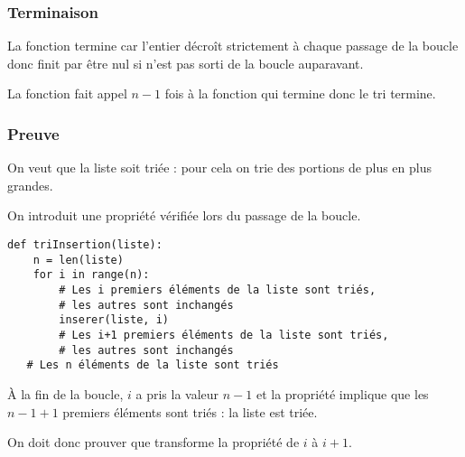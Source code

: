\subsubsection{Terminaison} La fonction  termine car l'entier  décroît strictement à chaque passage de la boucle donc finit par être nul si n'est pas sorti de la boucle auparavant.

La fonction  fait appel $n-1$ fois à la fonction   qui termine donc le tri termine.

\subsubsection{Preuve} On veut que la liste soit triée : pour cela on trie des portions de plus en plus grandes.

On introduit une propriété vérifiée lors du passage de la boucle.
\begin{lstlisting}
def triInsertion(liste):
    n = len(liste)
    for i in range(n):
        # Les i premiers éléments de la liste sont triés, 
        # les autres sont inchangés
        inserer(liste, i)
        # Les i+1 premiers éléments de la liste sont triés, 
        # les autres sont inchangés
   # Les n éléments de la liste sont triés
\end{lstlisting}
À la fin de la boucle, $i$ a pris la valeur $n-1$ et la propriété implique que les $n-1+1$ premiers éléments sont triés : la liste est triée.

On doit donc prouver que  transforme la propriété de $i$ à $i+1$.

